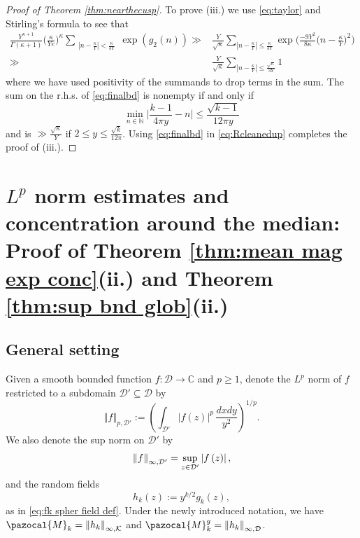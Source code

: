 \documentclass[12pt, a4paper]{amsart}
\theoremstyle{definition}
\newcommand {\1} {\mathbf{1}}
\newcommand {\M} {\pazocal {M}}
\newcommand {\Dc} {\mathcal{D}}
\newcommand {\Kc} {\mathcal{K}}
\numberwithin{equation}{section}
\begin{document}
\begin{proof}[Proof of Theorem \ref{thm:nearthecusp}]
To prove (iii.) we use \eqref{eq:taylor} and Stirling's formula to see that
\begin{equation} \label{eq:finalbd}
\begin{split}
\frac{Y^{\kappa+1}}{\Gamma(\kappa+1)}\bigg(\frac{\kappa}{Ye}\bigg)^{\kappa}\sum_{\substack{|n-\frac{\kappa}{Y}| < \frac{\kappa}{3Y}}} \exp(g_2(n))
\gg& \frac{Y}{\sqrt{\kappa}}
\sum_{|n-\frac{\kappa
}{Y}| \le \frac{\kappa}{ 3Y}}
\exp\bigg( \frac{-9Y^2}{8\kappa}\bigg( n-\frac{\kappa}{Y}\bigg)^2\bigg)\\
\gg&
\frac{Y}{\sqrt{\kappa}}
\sum_{|n-\frac{\kappa
}{Y}| \le \frac{\sqrt{\kappa}}{ 3Y}}
1
\end{split}
\end{equation}
where we have used positivity of the summands to drop terms in the sum.
The sum on the r.h.s. of \eqref{eq:finalbd} is nonempty if and only if
\[ \min_{n \in \mathbb N } \bigg|\frac{k-1}{4\pi y}-n\bigg| \le \frac{\sqrt{k-1}}{12 \pi y}\]
and is $\gg \tfrac{\sqrt{\kappa}}{Y}$ if $2 \le y \le \tfrac{\sqrt{k}}{12\pi}$.
Using \eqref{eq:finalbd} in \eqref{eq:Rcleanedup} completes the proof of (iii.). \end{proof}




\section{\texorpdfstring{$L^p$}{Lp} norm estimates and concentration around the median: Proof of Theorem \ref{thm:mean mag exp conc}(ii.) and Theorem \ref{thm:sup bnd glob}(ii.)}
\label{sec:low bnd conc}

\subsection{General setting}

Given a smooth bounded function $f:\Dc\to\mathbb{C}$ and $p\ge1$,
denote the $L^{p}$ norm of $f$ restricted to a subdomain $\Dc'\subseteq\Dc$ by
\[
\left\Vert f\right\Vert _{p,\Dc'}:=\left(\int_{\Dc'}\left|f\left(z\right)\right|^{p}\,\frac{dxdy}{y^{2}}\right)^{1/p}.
\]
We also denote the sup norm on $\Dc'$ by
\begin{equation} \notag
\left\Vert f\right\Vert _{\infty,\Dc'}=\sup_{z\in\Dc'}\left|f\left(z\right)\right|,
\end{equation}
and the random fields
\begin{equation}
\label{eq:Fk=y^k/2 gk}
h_{k}\left(z\right):=y^{k/2}g_{k}\left(z\right),
\end{equation}
as in \eqref{eq:fk spher field def}.
Under the newly introduced notation, we have $\M_{k} = \left\Vert h_{k}\right\Vert _{\infty,\Kc}$ and $\M^g_{k} = \left\Vert h_{k}\right\Vert _{\infty,\Dc}$.
\end{document}
